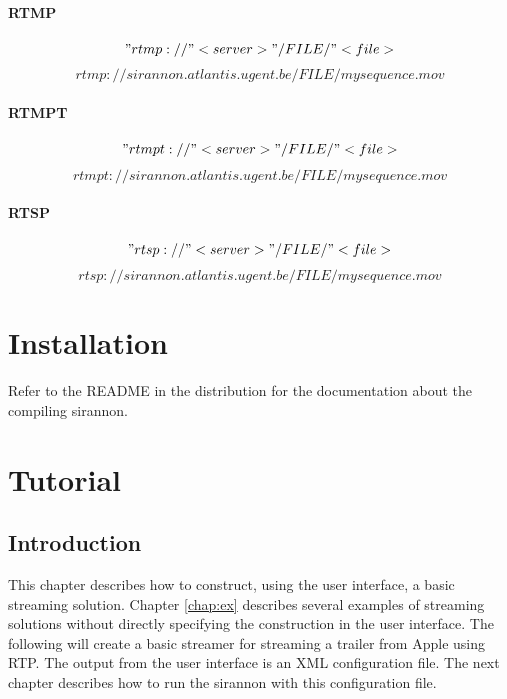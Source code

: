 \documentclass[12pt]{report}
\begin{document}
\subsubsection{RTMP}
$$"rtmp://" <server> "/FILE/" <file>$$\newline
$$rtmp://sirannon.atlantis.ugent.be/FILE/mysequence.mov$$

\subsubsection{RTMPT}
$$"rtmpt://" <server> "/FILE/" <file>$$\newline
$$rtmpt://sirannon.atlantis.ugent.be/FILE/mysequence.mov$$

\subsubsection{RTSP}
$$"rtsp://" <server> "/FILE/" <file>$$\newline
$$rtsp://sirannon.atlantis.ugent.be/FILE/mysequence.mov$$

\chapter{Installation}
\label{chap:installation}
Refer to the README in the distribution for the documentation about the compiling sirannon.
\newpage

\chapter{Tutorial}
\section{Introduction}
This chapter describes how to construct, using the user interface, a basic streaming solution. Chapter \ref{chap:ex} describes several examples of streaming solutions without directly specifying the construction in the user interface. The following will create a basic streamer for streaming a trailer from Apple using RTP. The output from the user interface is an XML configuration file. The next chapter describes how to run the sirannon with this configuration file.
\newpage
\end{document}
